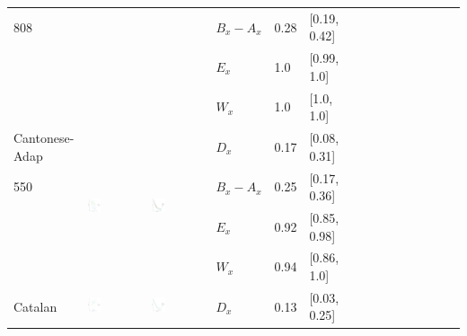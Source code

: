 \documentclass[11pt,letterpaper]{article}
\begin{document}
\begin{longtable}{lllllllllllllll}
808  &    &    &  $B_x-A_x$  &  0.28  &  [0.19, 0.42]  \\ 
  &    &    &  $E_x$  &  1.0  &  [0.99, 1.0]  \\ 
  &    &    &  $W_x$  &  1.0  &  [1.0, 1.0]  \\ [10.25ex] \hline
Cantonese-Adap  &  \multirow{4}{*}{\includegraphics[width=0.25\textwidth]{figures/Cantonese-Adap-entropy-memory.pdf}}  &  \multirow{4}{*}{\includegraphics[width=0.25\textwidth]{figures/Cantonese-Adap-listener-surprisal-memory.pdf}}  &  $D_x$  &  0.17  &  [0.08, 0.31]  \\ 
550  &    &    &  $B_x-A_x$  &  0.25  &  [0.17, 0.36]  \\ 
  &    &    &  $E_x$  &  0.92  &  [0.85, 0.98]  \\ 
  &    &    &  $W_x$  &  0.94  &  [0.86, 1.0]  \\ [10.25ex] \hline
Catalan  &  \multirow{4}{*}{\includegraphics[width=0.25\textwidth]{figures/Catalan-entropy-memory.pdf}}  &  \multirow{4}{*}{\includegraphics[width=0.25\textwidth]{figures/Catalan-listener-surprisal-memory.pdf}}  &  $D_x$  &  0.13  &  [0.03, 0.25]  \\ 

\end{longtable}
\end{document}
